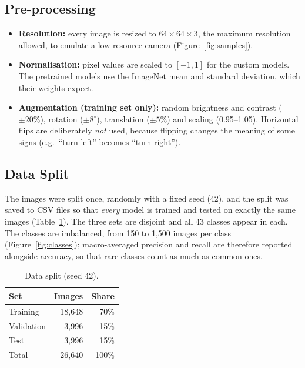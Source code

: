 \documentclass[11pt, a4paper]{article}
\begin{document}
\subsection{Pre-processing}

\begin{itemize}
    \item \textbf{Resolution:} every image is resized to $64 \times 64 \times 3$, the maximum resolution allowed, to
          emulate a low-resource camera (Figure~\ref{fig:samples}).
    \item \textbf{Normalisation:} pixel values are scaled to $[-1, 1]$ for the custom models. The pretrained models use
          the ImageNet mean and standard deviation, which their weights expect.
    \item \textbf{Augmentation (training set only):} random brightness and contrast ($\pm 20\%$), rotation
          ($\pm 8^\circ$), translation ($\pm 5\%$) and scaling (0.95--1.05). Horizontal flips are deliberately
          \emph{not} used, because flipping changes the meaning of some signs (e.g.\ ``turn left'' becomes ``turn right'').
\end{itemize}

\subsection{Data Split}

The images were split once, randomly with a fixed seed (42), and the split was saved to CSV files so that
\emph{every} model is trained and tested on exactly the same images (Table~\ref{tab:split}). The three sets are
disjoint and all 43 classes appear in each. The classes are imbalanced, from 150 to 1,500 images per class
(Figure~\ref{fig:classes}); macro-averaged precision and recall are therefore reported alongside accuracy, so that
rare classes count as much as common ones.

\begin{table}[H]
\centering
\caption{Data split (seed 42).}
\label{tab:split}
\begin{tabular}{lrr}
\toprule
\textbf{Set} & \textbf{Images} & \textbf{Share} \\
\midrule
Training   & 18,648 & 70\% \\
Validation & 3,996  & 15\% \\
Test       & 3,996  & 15\% \\
\midrule
Total      & 26,640 & 100\% \\
\bottomrule
\end{tabular}
\end{table}
\end{document}
